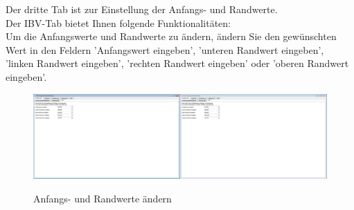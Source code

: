 \noindent
Der dritte Tab ist zur Einstellung der Anfangs- und Randwerte.\\
Der IBV-Tab bietet Ihnen folgende Funktionalitäten:\\
Um die Anfangswerte und Randwerte zu ändern, ändern Sie den gewünschten Wert in den Feldern 'Anfangswert eingeben', 'unteren Randwert eingeben', 'linken Randwert eingeben', 'rechten Randwert eingeben' oder 'oberen Randwert eingeben'.
\begin{figure}[H]
\centering
\includegraphics[scale=.25]{Bilder/IBVWerteAendern.png}\\
\caption{Anfangs- und Randwerte ändern}
\label{IBVWerteAendern}
\end{figure}

